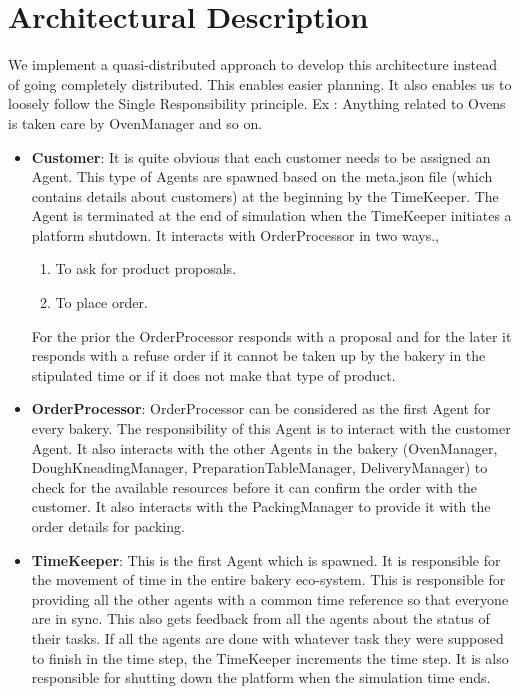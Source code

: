 \documentclass[12pt]{article}
\begin{document}
\section{Architectural Description}%
\label{sec:description}
We implement a quasi-distributed approach to develop this architecture instead of going completely distributed. This enables easier planning. It also enables us to loosely follow the Single Responsibility principle. Ex : Anything related to Ovens is taken care by OvenManager and so on.
\begin{itemize}
    \item \textbf{Customer}: It is quite obvious that each customer needs to be assigned an Agent. This type of Agents are spawned based on the meta.json file (which contains details about customers) at the beginning by the TimeKeeper. The Agent is terminated at the end of simulation when the TimeKeeper initiates a platform shutdown. It interacts with OrderProcessor in two ways.,
    \begin{enumerate}
    	\item To ask for product proposals.
    	\item To place order. 
    \end{enumerate}
    For the prior the OrderProcessor responds with a proposal and for the later it responds with a refuse order if it cannot be taken up by the bakery in the stipulated time or if it does not make that type of product.
    \item \textbf{OrderProcessor}: OrderProcessor can be considered as the first Agent for every bakery. The responsibility of this Agent is to interact with the customer Agent. It also interacts with the other Agents in the bakery (OvenManager, DoughKneadingManager, PreparationTableManager, DeliveryManager) to check for the available resources before it can confirm the order with the customer. It also interacts with the PackingManager to provide it with the order details for packing.
    \item \textbf{TimeKeeper}: This is the first Agent which is spawned. It is responsible for the movement of time in the entire bakery eco-system. This is responsible for providing all the other agents with a common time reference so that everyone are in sync. This also gets feedback from all the agents about the status of their tasks. If all the agents are done with whatever task they were supposed to finish in the time step, the TimeKeeper increments the time step. It is also responsible for shutting down the platform when the simulation time ends.

\end{itemize}
\end{document}

